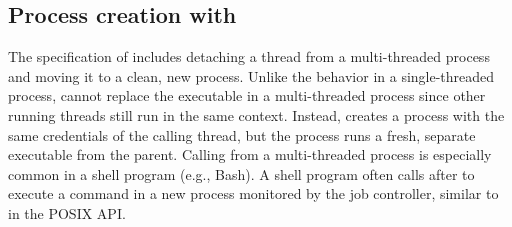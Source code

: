 \begin{comment}
\vspace{5pt}
\noindent{\bf Discussion.~}
A Graphene picoprocess can copy part or all its address space into a child
picoprocess relatively efficiently.
Although this mechanism is less efficient than an in-kernel {\tt fork},
we wanted to maintain the generality benefits of recent \liboses{},
and only added the minimal building blocks to the host ABI.
The transfer of data is explicit to the host, can be mediated by a reference monitor,
the sender, or the receiver.
For instance, recent Unix systems introduced a close-on-exec flag for file handles~\citep{close-on-exec}, 
which prevents inheritance of handles to sensitive files.  This can be implemented
either in a parent, by excluding the file handle from a checkpoint, 
or in the child, by closing this handle on an {\tt exec} call.
Our current implementation implements close-on-exec in the child for complete compatibility,
but a more security-sensitive application could easily implement ``close-on-fork'' semantics 
in the parent.
This clean division of labor retains full functionality
and facilitates extensibility.


\end{comment}



\subsection{Process creation with }


The specification of  includes detaching a thread from a multi-threaded process and moving it to a clean, new process.
Unlike the behavior in a single-threaded process,
 cannot replace the executable in a multi-threaded process since other running threads still run in the same context.
Instead,  creates a process
with the same credentials of the calling thread, but the process runs a fresh, separate executable from the parent.
Calling  from a multi-threaded process 
is especially common in a shell program (e.g., Bash).
A shell program often calls  after  to execute a command in a new process monitored by the job controller, similar to  in the POSIX API.


